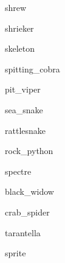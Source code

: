 \documentclass[letterpaper,serif]{module}
\begin{document}
\begin{newmonster}{shrew}\end{newmonster}

\begin{newmonster}{shrieker}\end{newmonster}

\begin{newmonster}{skeleton}\end{newmonster}


\begin{newmonster}{spitting_cobra}\end{newmonster}

\begin{newmonster}{pit_viper}\end{newmonster}

\begin{newmonster}{sea_snake}\end{newmonster}

\begin{newmonster}{rattlesnake}\end{newmonster}

\begin{newmonster}{rock_python}\end{newmonster}

\begin{newmonster}{spectre}\end{newmonster}


\begin{newmonster}{black_widow}\end{newmonster}

\begin{newmonster}{crab_spider}\end{newmonster}

\begin{newmonster}{tarantella}\end{newmonster}

\begin{newmonster}{sprite}\end{newmonster}
\end{document}
